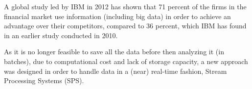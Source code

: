 A global study led by IBM in 2012 has shown that 71 percent of the firms in the financial market use information (including big data)
in order to achieve an advantage over their competitors, compared to 36 percent, which IBM has found in an earlier study conducted in 2010. \cite[p.1]{ibm-financial}

As it is no longer feasible to save all the data before then analyzing it (in batches), due to computational cost and lack of storage capacity, 
a new approach was designed in order to handle data in a (near) real-time fashion, Stream Processing Systems (SPS).
